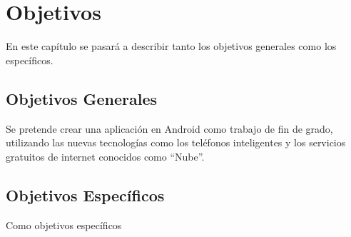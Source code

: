 %
%
%
%

\cleardoublepage
\chapter{Objetivos}
\label{chap:objetives}

	En este capítulo se pasará a describir tanto los objetivos generales como los específicos.
	
	
	\section{Objetivos Generales}
		Se pretende crear una aplicación en Android como trabajo de fin de grado, utilizando las nuevas tecnologías como los teléfonos inteligentes y los servicios gratuitos de internet conocidos como ``Nube''.
	
	\section{Objetivos Específicos}
		Como objetivos específicos
		